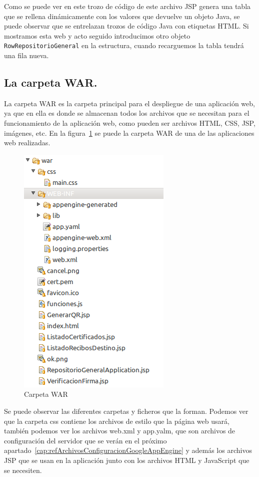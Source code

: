 Como se puede ver en este trozo de código de este archivo JSP genera una tabla que se rellena dinámicamente con los valores que devuelve un objeto Java, se puede observar que se entrelazan trozos de código Java con etiquetas HTML. Si mostramos esta web y acto seguido introducimos otro objeto \lstinline{RowRepositorioGeneral} en la estructura, cuando recarguemos la tabla tendrá una fila nueva.

\subsection{La carpeta WAR.}

La carpeta WAR es la carpeta principal para el despliegue de una aplicación web, ya que en ella es donde se almacenan todos los archivos que se necesitan para el funcionamiento de la aplicación web, como pueden ser archivos HTML, CSS, JSP, imágenes, etc. En la figura~\ref{fig:carpetawar} se puede la carpeta WAR de una de las aplicaciones web realizadas.

\begin{figure}
  \centering
    \includegraphics{./GoogleAppEngine/imagenes/carpetawar.png}
  \caption{Carpeta WAR}
  \label{fig:carpetawar}
\end{figure}

Se puede observar las diferentes carpetas y ficheros que la forman. Podemos ver que la carpeta css contiene los archivos de estilo que la página web usará, también podemos ver los archivos web.xml y app.yalm, que son archivos de configuración del servidor que se verán en el próximo apartado~\ref{cap:refArchivosConfiguracionGoogleAppEngine} y además los archivos JSP que se usan en la aplicación junto con los archivos HTML y JavaScript que se necesiten.

